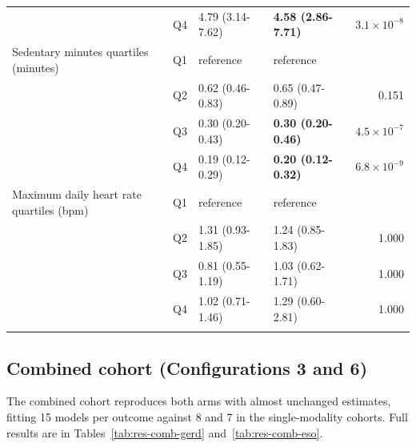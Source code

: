 \documentclass[11pt]{article}
\begin{document}
\begin{longtable}{@{}p{5.2cm}c p{3.0cm} p{3.0cm} r@{}}
 & Q4 & 4.79 (3.14-7.62) & \textbf{4.58 (2.86-7.71)} & $3.1\times10^{-8}$ \\
\addlinespace
Sedentary minutes quartiles (minutes) & Q1 & reference & reference & \\
 & Q2 & 0.62 (0.46-0.83) & 0.65 (0.47-0.89) & 0.151 \\
 & Q3 & 0.30 (0.20-0.43) & \textbf{0.30 (0.20-0.46)} & $4.5\times10^{-7}$ \\
 & Q4 & 0.19 (0.12-0.29) & \textbf{0.20 (0.12-0.32)} & $6.8\times10^{-9}$ \\
\addlinespace
Maximum daily heart rate quartiles (bpm) & Q1 & reference & reference & \\
 & Q2 & 1.31 (0.93-1.85) & 1.24 (0.85-1.83) & 1.000 \\
 & Q3 & 0.81 (0.55-1.19) & 1.03 (0.62-1.71) & 1.000 \\
 & Q4 & 1.02 (0.71-1.46) & 1.29 (0.60-2.81) & 1.000 \\
\addlinespace
\bottomrule \end{longtable}

\subsection{Combined cohort (Configurations 3 and 6)}
\label{sec:res-comb}
The combined cohort reproduces both arms with almost unchanged estimates, fitting 15 models per
outcome against 8 and 7 in the single-modality cohorts. Full results are in
Tables~\ref{tab:res-comb-gerd} and~\ref{tab:res-comb-eso}.
\end{document}
